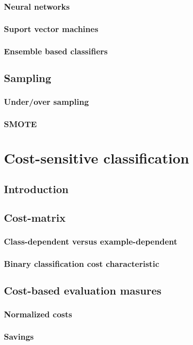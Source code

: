\documentclass[twoside,openright,titlepage,numbers=noenddot,headinclude,%
               footinclude=true,cleardoublepage=empty,abstractoff,BCOR=5mm,%
               paper=a4,fontsize=11pt,ngerman,american]{scrreprt}
\numberwithin{theorem}{chapter}
\numberwithin{definition}{chapter}
\numberwithin{algorithm}{chapter}
\numberwithin{figure}{chapter}
\numberwithin{table}{chapter}
\numberwithin{equation}{chapter}
\begin{document}
			\subsection{Neural networks}
			\subsection{Suport vector machines}
			\subsection{Ensemble based classifiers}
		\section{Sampling}
			\subsection{Under/over sampling}
			\subsection{SMOTE}
		
	\chapter{Cost-sensitive classification}
		\section{Introduction}
		\section{Cost-matrix}
			\subsection{Class-dependent versus example-dependent}
			\subsection{Binary classification cost characteristic}
		\section{Cost-based evaluation masures}
			\subsection{Normalized costs}
			\subsection{Savings}		
\end{document}
